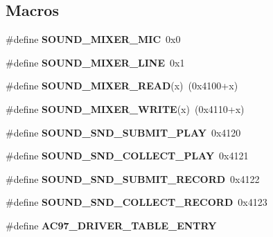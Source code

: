\subsection*{Macros}
\begin{DoxyCompactItemize}
\item 
\mbox{\label{group__lm32__milkymist__ac97_gaca9c6b838b9d2c7df60fee2271b858f2}} 
\#define {\bfseries S\+O\+U\+N\+D\+\_\+\+M\+I\+X\+E\+R\+\_\+\+M\+IC}~0x0
\item 
\mbox{\label{group__lm32__milkymist__ac97_gad6ffe08f0930c25433d318c4da94e8d9}} 
\#define {\bfseries S\+O\+U\+N\+D\+\_\+\+M\+I\+X\+E\+R\+\_\+\+L\+I\+NE}~0x1
\item 
\mbox{\label{group__lm32__milkymist__ac97_ga8de051c9f7136ad1b824c71d36c3558d}} 
\#define {\bfseries S\+O\+U\+N\+D\+\_\+\+M\+I\+X\+E\+R\+\_\+\+R\+E\+AD}(x)~(0x4100+x)
\item 
\mbox{\label{group__lm32__milkymist__ac97_ga6738d049d5388d54dd444dc0b0bf7f89}} 
\#define {\bfseries S\+O\+U\+N\+D\+\_\+\+M\+I\+X\+E\+R\+\_\+\+W\+R\+I\+TE}(x)~(0x4110+x)
\item 
\mbox{\label{group__lm32__milkymist__ac97_ga0b63dcae8055aaaf8860658154a7107a}} 
\#define {\bfseries S\+O\+U\+N\+D\+\_\+\+S\+N\+D\+\_\+\+S\+U\+B\+M\+I\+T\+\_\+\+P\+L\+AY}~0x4120
\item 
\mbox{\label{group__lm32__milkymist__ac97_gaddba19d7dede96b855f8e68fa0ba2b9b}} 
\#define {\bfseries S\+O\+U\+N\+D\+\_\+\+S\+N\+D\+\_\+\+C\+O\+L\+L\+E\+C\+T\+\_\+\+P\+L\+AY}~0x4121
\item 
\mbox{\label{group__lm32__milkymist__ac97_ga16d97ae577218ac0c16d597b24da1b56}} 
\#define {\bfseries S\+O\+U\+N\+D\+\_\+\+S\+N\+D\+\_\+\+S\+U\+B\+M\+I\+T\+\_\+\+R\+E\+C\+O\+RD}~0x4122
\item 
\mbox{\label{group__lm32__milkymist__ac97_ga208d331118698447d8dc4c852ee7a8d7}} 
\#define {\bfseries S\+O\+U\+N\+D\+\_\+\+S\+N\+D\+\_\+\+C\+O\+L\+L\+E\+C\+T\+\_\+\+R\+E\+C\+O\+RD}~0x4123
\item 
\#define {\bfseries A\+C97\+\_\+\+D\+R\+I\+V\+E\+R\+\_\+\+T\+A\+B\+L\+E\+\_\+\+E\+N\+T\+RY}
\end{DoxyCompactItemize}
